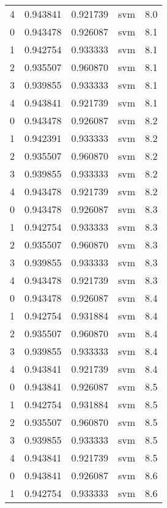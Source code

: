 \begin{tabular}{rrrlr}
     4 & 0.943841 & 0.921739 &      svm &        8.0 \\
     0 & 0.943478 & 0.926087 &      svm &        8.1 \\
     1 & 0.942754 & 0.933333 &      svm &        8.1 \\
     2 & 0.935507 & 0.960870 &      svm &        8.1 \\
     3 & 0.939855 & 0.933333 &      svm &        8.1 \\
     4 & 0.943841 & 0.921739 &      svm &        8.1 \\
     0 & 0.943478 & 0.926087 &      svm &        8.2 \\
     1 & 0.942391 & 0.933333 &      svm &        8.2 \\
     2 & 0.935507 & 0.960870 &      svm &        8.2 \\
     3 & 0.939855 & 0.933333 &      svm &        8.2 \\
     4 & 0.943478 & 0.921739 &      svm &        8.2 \\
     0 & 0.943478 & 0.926087 &      svm &        8.3 \\
     1 & 0.942754 & 0.933333 &      svm &        8.3 \\
     2 & 0.935507 & 0.960870 &      svm &        8.3 \\
     3 & 0.939855 & 0.933333 &      svm &        8.3 \\
     4 & 0.943478 & 0.921739 &      svm &        8.3 \\
     0 & 0.943478 & 0.926087 &      svm &        8.4 \\
     1 & 0.942754 & 0.931884 &      svm &        8.4 \\
     2 & 0.935507 & 0.960870 &      svm &        8.4 \\
     3 & 0.939855 & 0.933333 &      svm &        8.4 \\
     4 & 0.943841 & 0.921739 &      svm &        8.4 \\
     0 & 0.943841 & 0.926087 &      svm &        8.5 \\
     1 & 0.942754 & 0.931884 &      svm &        8.5 \\
     2 & 0.935507 & 0.960870 &      svm &        8.5 \\
     3 & 0.939855 & 0.933333 &      svm &        8.5 \\
     4 & 0.943841 & 0.921739 &      svm &        8.5 \\
     0 & 0.943841 & 0.926087 &      svm &        8.6 \\
     1 & 0.942754 & 0.933333 &      svm &        8.6 \\

\end{tabular}
